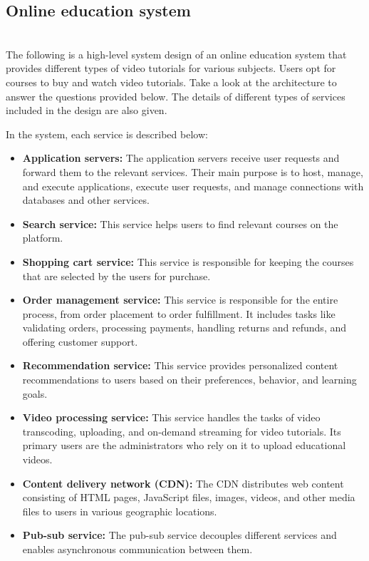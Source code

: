 

\subsection{Online education system}\label{Online-education-platform}
\\
The following is a high-level system design of an online education system that provides different types of video tutorials for various subjects. Users opt for courses to buy and watch video tutorials. Take a look at the architecture to answer the questions provided below. The details of different types of services included in the design are also given.

In the system, each service is described below:

\begin{itemize}
\tightlist
\item
\textbf{Application servers:} The application servers receive user requests and forward them to the relevant services. Their main purpose is to host, manage, and execute applications, execute user requests, and manage connections with databases and other services.
\item
\textbf{Search service:} This service helps users to find relevant courses on the platform.
\item
\textbf{Shopping cart service:} This service is responsible for keeping the courses that are selected by the users for purchase.
\item
\textbf{Order management service:} This service is responsible for the entire process, from order placement to order fulfillment. It includes tasks like validating orders, processing payments, handling returns and refunds, and offering customer support.
\item
\textbf{Recommendation service:} This service provides personalized content recommendations to users based on their preferences, behavior, and learning goals.
\item
\textbf{Video processing service:} This service handles the tasks of video transcoding, uploading, and on-demand streaming for video tutorials. Its primary users are the administrators who rely on it to upload educational videos.
\item
\textbf{Content delivery network (CDN):} The CDN distributes web content consisting of HTML pages, JavaScript files, images, videos, and other media files to users in various geographic locations.
\item
\textbf{Pub-sub service:} The pub-sub service decouples different services and enables asynchronous communication between them.
\end{itemize}

